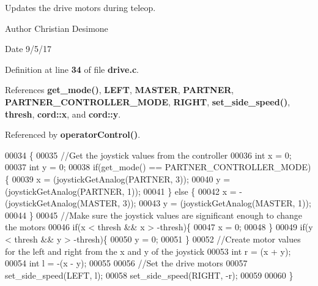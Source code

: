 Updates the drive motors during teleop. 

\begin{DoxyAuthor}{Author}
Christian Desimone 
\end{DoxyAuthor}
\begin{DoxyDate}{Date}
9/5/17 
\end{DoxyDate}


Definition at line \textbf{ 34} of file \textbf{ drive.\+c}.



References \textbf{ get\+\_\+mode()}, \textbf{ L\+E\+FT}, \textbf{ M\+A\+S\+T\+ER}, \textbf{ P\+A\+R\+T\+N\+ER}, \textbf{ P\+A\+R\+T\+N\+E\+R\+\_\+\+C\+O\+N\+T\+R\+O\+L\+L\+E\+R\+\_\+\+M\+O\+DE}, \textbf{ R\+I\+G\+HT}, \textbf{ set\+\_\+side\+\_\+speed()}, \textbf{ thresh}, \textbf{ cord\+::x}, and \textbf{ cord\+::y}.



Referenced by \textbf{ operator\+Control()}.


\begin{DoxyCode}
00034                           \{
00035   \textcolor{comment}{//Get the joystick values from the controller}
00036   \textcolor{keywordtype}{int} x = 0;
00037   \textcolor{keywordtype}{int} y = 0;
00038   \textcolor{keywordflow}{if}(get_mode() == PARTNER_CONTROLLER_MODE) \{
00039     x = (joystickGetAnalog(PARTNER, 3));
00040     y = (joystickGetAnalog(PARTNER, 1));
00041   \} \textcolor{keywordflow}{else} \{
00042     x = -(joystickGetAnalog(MASTER, 3));
00043     y = (joystickGetAnalog(MASTER, 1));
00044   \}
00045   \textcolor{comment}{//Make sure the joystick values are significant enough to change the motors}
00046   \textcolor{keywordflow}{if}(x < thresh && x > -thresh)\{
00047     x = 0;
00048   \}
00049   \textcolor{keywordflow}{if}(y < thresh && y > -thresh)\{
00050     y = 0;
00051   \}
00052   \textcolor{comment}{//Create motor values for the left and right from the x and y of the joystick}
00053   \textcolor{keywordtype}{int} r = (x + y);
00054   \textcolor{keywordtype}{int} l = -(x - y);
00055 
00056   \textcolor{comment}{//Set the drive motors}
00057   set_side_speed(LEFT, l);
00058   set_side_speed(RIGHT, -r);
00059 
00060 \}
\end{DoxyCode}
